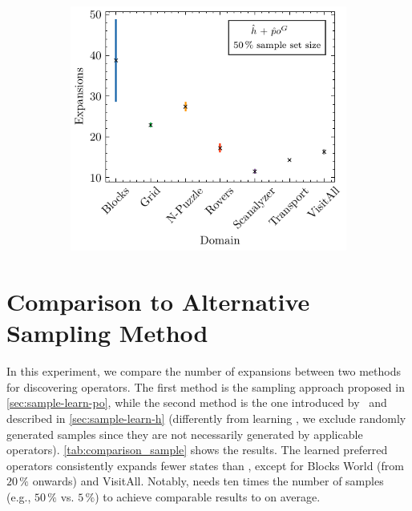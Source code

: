 \documentclass[ppgc,diss,english]{iiufrgs}
\begin{document}
\begin{figure}[tb]
  \vspace{0.5cm}

  \begin{subfigure}{0.41\textwidth}
    \centering
    \includegraphics[width=\linewidth]{img/error_hNN_poG_50pct.pdf}
  \end{subfigure}
  \label{fig:errors}
\end{figure}


\section{Comparison to Alternative Sampling Method}
\label{sec:exp-comparison-sample-method}
In this experiment, we compare the number of expansions between two methods for discovering operators. The first method is the sampling approach proposed in \cref{sec:sample-learn-po}, while the second method is the one introduced by~\citet{Bettker.etal/2022} and described in \cref{sec:sample-learn-h} (differently from learning \hnn, we exclude randomly generated samples since they are not necessarily generated by applicable operators).
\cref{tab:comparison_sample} shows the results. The learned preferred operators \pog consistently expands fewer states than \pofsm, except for Blocks World (from $20\,\%$ onwards) and VisitAll. Notably, \pofsm needs ten times the number of samples (e.g., $50\,\%$ vs. $5\,\%$) to achieve comparable results to \pog on average.
\end{document}
